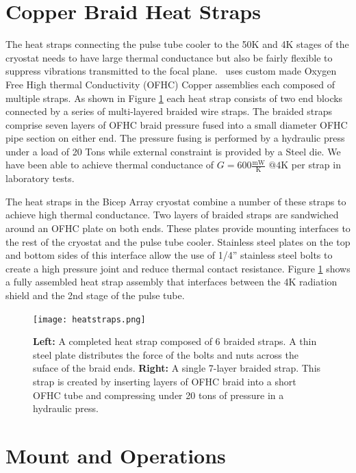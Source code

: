 \documentclass[]{spie}  %
\begin{document}
\section{Copper Braid Heat Straps}

The heat straps connecting the pulse tube cooler to the 50K and 4K stages of
the cryostat needs to have large thermal conductance but also be fairly
flexible to suppress vibrations transmitted to the focal plane. \biceparray \ 
uses custom made Oxygen Free High thermal Conductivity (OFHC) Copper
assemblies each composed of multiple straps. As shown
in Figure \ref{fig:heatstrap} each heat strap consists of two end blocks
connected by a series of multi-layered braided wire straps. The braided straps
comprise seven layers of OFHC braid pressure fused into a small diameter OFHC
pipe section on either end. The pressure fusing is performed by a hydraulic
press under a load of 20 Tons while external constraint is provided by a Steel
die. We have been able to achieve thermal conductance of $G=600
\frac{\text{mW}}{\text{K}} \text{  @}4\text{K}$ per strap in laboratory tests.

The heat straps in the Bicep Array cryostat combine a number of these straps
to achieve high thermal conductance. Two layers of braided straps are
sandwiched around an OFHC plate on both ends. These plates provide mounting
interfaces to the rest of the cryostat and the pulse tube cooler. Stainless
steel plates on the top and bottom sides of this interface allow the use of
1/4'' stainless steel bolts to create a high pressure joint and reduce thermal
contact resistance. Figure \ref{fig:heatstrap} shows a fully assembled heat
strap assembly that interfaces between the 4K radiation shield and the 2nd
stage of the pulse tube.

\clearpage


\begin{figure}[ht]
\center
\texttt{[image: heatstraps.png]}
\caption{\textbf{Left:} A completed heat strap composed of 6 braided straps. A thin steel plate distributes the force of the bolts and nuts across the suface of the braid ends. \textbf{Right:} A single 7-layer braided strap. This strap is created by inserting layers of OFHC braid into a short OFHC tube and compressing under 20 tons of pressure in a hydraulic press.}
\label{fig:heatstrap}
\end{figure}


\section{Mount and Operations}
\end{document}
